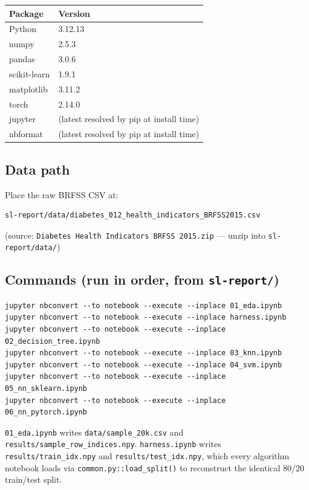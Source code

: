 \documentclass[11pt]{article}
\newcommand{\code}[1]{\texttt{#1}}
\begin{document}
\begin{center}
\begin{tabular}{ll}
\toprule
Package & Version \\
\midrule
Python & 3.12.13 \\
numpy & 2.5.3 \\
pandas & 3.0.6 \\
scikit-learn & 1.9.1 \\
matplotlib & 3.11.2 \\
torch & 2.14.0 \\
jupyter & (latest resolved by pip at install time) \\
nbformat & (latest resolved by pip at install time) \\
\bottomrule
\end{tabular}
\end{center}

\subsection*{Data path}

Place the raw BRFSS CSV at:

\begin{verbatim}
sl-report/data/diabetes_012_health_indicators_BRFSS2015.csv
\end{verbatim}

(source: \code{Diabetes Health Indicators BRFSS 2015.zip} --- unzip into \code{sl-report/data/})

\subsection*{Commands (run in order, from \code{sl-report/})}

\begin{verbatim}
jupyter nbconvert --to notebook --execute --inplace 01_eda.ipynb
jupyter nbconvert --to notebook --execute --inplace harness.ipynb
jupyter nbconvert --to notebook --execute --inplace 02_decision_tree.ipynb
jupyter nbconvert --to notebook --execute --inplace 03_knn.ipynb
jupyter nbconvert --to notebook --execute --inplace 04_svm.ipynb
jupyter nbconvert --to notebook --execute --inplace 05_nn_sklearn.ipynb
jupyter nbconvert --to notebook --execute --inplace 06_nn_pytorch.ipynb
\end{verbatim}

\code{01\_eda.ipynb} writes \code{data/sample\_20k.csv} and \code{results/sample\_row\_indices.npy}.
\code{harness.ipynb} writes \code{results/train\_idx.npy} and \code{results/test\_idx.npy}, which every algorithm notebook loads via \code{common.py::load\_split()} to reconstruct the identical 80/20 train/test split.
\end{document}
